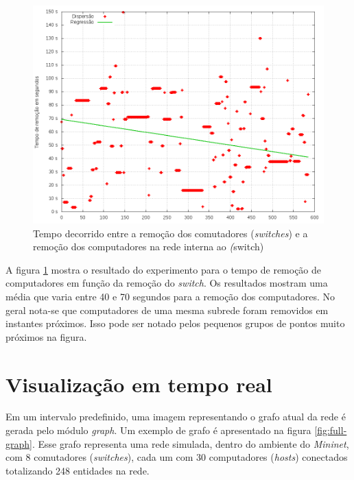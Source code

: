 \begin{figure}[h!]
    \centering
    \label{fig:hosts-behind-switch-time}
    \includegraphics[width=\linewidth]{img/hosts-behind-switch-time}
    \caption{Tempo decorrido entre a remoção dos comutadores 
    (\emph{switches}) e a remoção dos computadores na rede interna ao 
    \emph(switch)}
\end{figure}

A figura \ref{fig:hosts-behind-switch-time} mostra o resultado do experimento
para o tempo de remoção de computadores em função da remoção do 
\emph{switch}.
Os resultados mostram uma média que varia entre 40 e 70 segundos para a 
remoção dos computadores.
No geral nota-se que computadores de uma mesma subrede foram removidos em 
instantes próximos.
Isso pode ser notado pelos pequenos grupos de pontos muito próximos na 
figura.

\section{Visualização em tempo real}

Em um intervalo predefinido, uma imagem representando o grafo atual da rede
é gerada pelo módulo \emph{graph}.
Um exemplo de grafo é apresentado na figura \ref{fig:full-graph}.
Esse grafo representa uma rede simulada, dentro do ambiente do 
\emph{Mininet}, com 8 comutadores (\emph{switches}), cada um com 30 
computadores (\emph{hosts}) conectados totalizando 248 entidades na rede.


